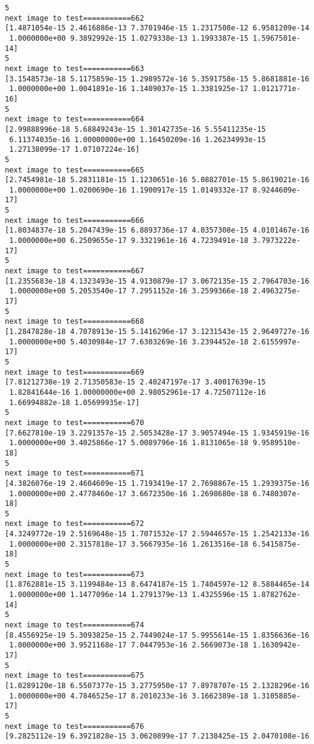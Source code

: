 \documentclass[11pt]{article}
\begin{document}
\begin{Verbatim}[commandchars=\\\{\}]
5
next image to test===========662
[1.4871054e-15 2.4616886e-13 7.3701946e-15 1.2317508e-12 6.9581209e-14
 1.0000000e+00 9.3892992e-15 1.0279338e-13 1.1993387e-15 1.5967501e-14]
5
next image to test===========663
[3.1548573e-18 5.1175859e-15 1.2989572e-16 5.3591758e-15 5.8681881e-16
 1.0000000e+00 1.0041891e-16 1.1409037e-15 1.3381925e-17 1.0121771e-16]
5
next image to test===========664
[2.99888996e-18 5.68849243e-15 1.30142735e-16 5.55411235e-15
 6.11374035e-16 1.00000000e+00 1.16450209e-16 1.26234993e-15
 1.27138099e-17 1.07107224e-16]
5
next image to test===========665
[2.7454981e-18 5.2831181e-15 1.1230651e-16 5.0882701e-15 5.8619021e-16
 1.0000000e+00 1.0200690e-16 1.1900917e-15 1.0149332e-17 8.9244609e-17]
5
next image to test===========666
[1.8034837e-18 5.2047439e-15 6.8893736e-17 4.0357308e-15 4.0101467e-16
 1.0000000e+00 6.2509655e-17 9.3321961e-16 4.7239491e-18 3.7973222e-17]
5
next image to test===========667
[1.2355683e-18 4.1323493e-15 4.9130879e-17 3.0672135e-15 2.7964703e-16
 1.0000000e+00 5.2053540e-17 7.2951152e-16 3.2599366e-18 2.4963275e-17]
5
next image to test===========668
[1.2847828e-18 4.7078913e-15 5.1416296e-17 3.1231543e-15 2.9649727e-16
 1.0000000e+00 5.4030984e-17 7.6303269e-16 3.2394452e-18 2.6155997e-17]
5
next image to test===========669
[7.81212738e-19 2.71350583e-15 2.40247197e-17 3.40017639e-15
 1.82841644e-16 1.00000000e+00 2.98052961e-17 4.72507112e-16
 1.66994882e-18 1.05699935e-17]
5
next image to test===========670
[7.6627810e-19 3.2291357e-15 2.5053428e-17 3.9057494e-15 1.9345919e-16
 1.0000000e+00 3.4025866e-17 5.0089796e-16 1.8131065e-18 9.9589510e-18]
5
next image to test===========671
[4.3826076e-19 2.4604609e-15 1.7193419e-17 2.7698867e-15 1.2939375e-16
 1.0000000e+00 2.4778460e-17 3.6672350e-16 1.2698680e-18 6.7480307e-18]
5
next image to test===========672
[4.3249772e-19 2.5169648e-15 1.7071532e-17 2.5944657e-15 1.2542133e-16
 1.0000000e+00 2.3157818e-17 3.5667935e-16 1.2613516e-18 6.5415875e-18]
5
next image to test===========673
[1.8762881e-15 3.1199484e-13 8.6474187e-15 1.7404597e-12 8.5884465e-14
 1.0000000e+00 1.1477096e-14 1.2791379e-13 1.4325596e-15 1.8782762e-14]
5
next image to test===========674
[8.4556925e-19 5.3093825e-15 2.7449024e-17 5.9955614e-15 1.8356636e-16
 1.0000000e+00 3.9521168e-17 7.0447953e-16 2.5669073e-18 1.1630942e-17]
5
next image to test===========675
[1.0289120e-18 6.5507377e-15 3.2775950e-17 7.8978707e-15 2.1328296e-16
 1.0000000e+00 4.7846525e-17 8.2010233e-16 3.1662389e-18 1.3105885e-17]
5
next image to test===========676
[9.2825112e-19 6.3921828e-15 3.0620899e-17 7.2138425e-15 2.0470108e-16

\end{Verbatim}
\end{document}
